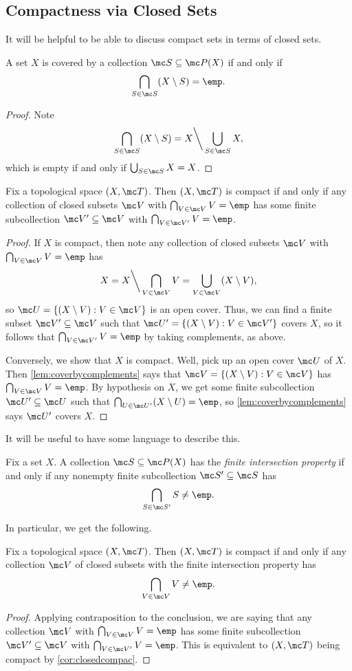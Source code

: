 \documentclass[../notes.tex]{subfiles}
\begin{document}
\subsection{Compactness via Closed Sets}
It will be helpful to be able to discuss compact sets in terms of closed sets.
\begin{lemma} \label{lem:coverbycomplements}
	A set $X$ is covered by a collection $\mc S\subseteq\mc P(X)$ if and only if
	\[\bigcap_{S\in\mc S}(X\setminus S)=\emp.\]
\end{lemma}
\begin{proof}
	Note
	\[\bigcap_{S\in\mc S}(X\setminus S)=X{\mathbin\bigg\backslash}\bigcup_{S\in\mc S}X,\]
	which is empty if and only if $\bigcup_{S\in\mc S}X=X$.
\end{proof}
\begin{corollary} \label{cor:closedcompac}
	Fix a topological space $(X,\mc T)$. Then $(X,\mc T)$ is compact if and only if any collection of closed subsets $\mc V$ with $\bigcap_{V\in\mc V}V=\emp$ has some finite subcollection $\mc V'\subseteq\mc V$ with $\bigcap_{V\in\mc V'}V=\emp$.
\end{corollary}
\begin{proof}
	If $X$ is compact, then note any collection of closed subsets $\mc V$ with $\bigcap_{V\in\mc V}V=\emp$ has
	\[X=X{\mathbin\bigg\backslash}\bigcap_{V\in\mc V}V=\bigcup_{V\in\mc V}(X\setminus V),\]
	so $\mc U=\{(X\setminus V):V\in\mc V\}$ is an open cover. Thus, we can find a finite subset $\mc V'\subseteq\mc V$ such that $\mc U'=\{(X\setminus V):V\in\mc V'\}$ covers $X$, so it follows that $\bigcap_{V\in\mc V'}V=\emp$ by taking complements, as above.

	Conversely, we show that $X$ is compact. Well, pick up an open cover $\mc U$ of $X$. Then \autoref{lem:coverbycomplements} says that $\mc V=\{(X\setminus V):V\in\mc V\}$ has $\bigcap_{V\in\mc V}V=\emp$. By hypothesis on $X$, we get some finite subcollection $\mc U'\subseteq\mc U$ such that $\bigcap_{U\in\mc U'}(X\setminus U)=\emp$, so \autoref{lem:coverbycomplements} says $\mc U'$ covers $X$.
\end{proof}
It will be useful to have some language to describe this.
\begin{definition}
	Fix a set $X$. A collection $\mc S\subseteq\mc P(X)$ has the \textit{finite intersection property} if and only if any nonempty finite subcollection $\mc S'\subseteq\mc S$ has
	\[\bigcap_{S\in\mc S'}S\ne\emp.\]
\end{definition}
In particular, we get the following.
\begin{proposition}
	Fix a topological space $(X,\mc T)$. Then $(X,\mc T)$ is compact if and only if any collection $\mc V$ of closed subsets with the finite intersection property has
	\[\bigcap_{V\in\mc V}V\ne\emp.\]
\end{proposition}
\begin{proof}
	Applying contraposition to the conclusion, we are saying that any collection $\mc V$ with $\bigcap_{V\in\mc V}V=\emp$ has some finite subcollection $\mc V'\subseteq\mc V$ with $\bigcap_{V\in\mc V'}V=\emp$. This is equivalent to $(X,\mc T)$ being compact by \autoref{cor:closedcompac}.
\end{proof}
\end{document}
